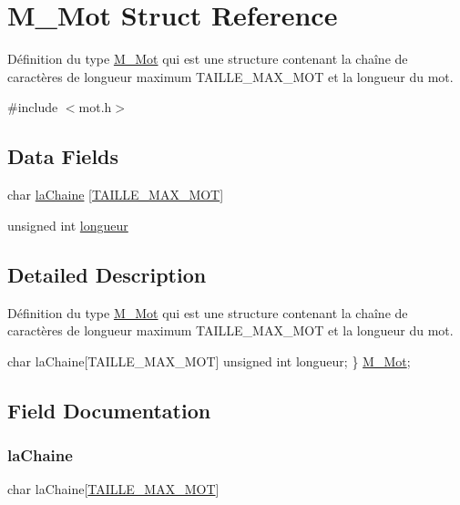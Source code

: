 \hypertarget{struct_m___mot}{}\section{M\+\_\+\+Mot Struct Reference}
\label{struct_m___mot}


Définition du type \hyperlink{struct_m___mot}{M\+\_\+\+Mot} qui est une structure contenant la chaîne de caractères de longueur maximum T\+A\+I\+L\+L\+E\+\_\+\+M\+A\+X\+\_\+\+M\+OT et la longueur du mot.  




{\ttfamily \#include $<$mot.\+h$>$}

\subsection*{Data Fields}
\begin{DoxyCompactItemize}
\item 
char \hyperlink{struct_m___mot_a31f00dde2743b67351f4dd3d2ea6000b}{la\+Chaine} \mbox{[}\hyperlink{mot_8h_a6e3eac6a90474b82603a7cbac5f4f628}{T\+A\+I\+L\+L\+E\+\_\+\+M\+A\+X\+\_\+\+M\+OT}\mbox{]}
\item 
unsigned int \hyperlink{struct_m___mot_a3dfad5cc5d44b479f0e42df8df2ae5d9}{longueur}
\end{DoxyCompactItemize}


\subsection{Detailed Description}
Définition du type \hyperlink{struct_m___mot}{M\+\_\+\+Mot} qui est une structure contenant la chaîne de caractères de longueur maximum T\+A\+I\+L\+L\+E\+\_\+\+M\+A\+X\+\_\+\+M\+OT et la longueur du mot. 

char la\+Chaine\mbox{[}T\+A\+I\+L\+L\+E\+\_\+\+M\+A\+X\+\_\+\+M\+OT\mbox{]} unsigned int longueur; \} \hyperlink{struct_m___mot}{M\+\_\+\+Mot}; 

\subsection{Field Documentation}
\mbox{\label{struct_m___mot_a31f00dde2743b67351f4dd3d2ea6000b}} 
\subsubsection{\texorpdfstring{la\+Chaine}{laChaine}}
{\footnotesize\ttfamily char la\+Chaine\mbox{[}\hyperlink{mot_8h_a6e3eac6a90474b82603a7cbac5f4f628}{T\+A\+I\+L\+L\+E\+\_\+\+M\+A\+X\+\_\+\+M\+OT}\mbox{]}}

